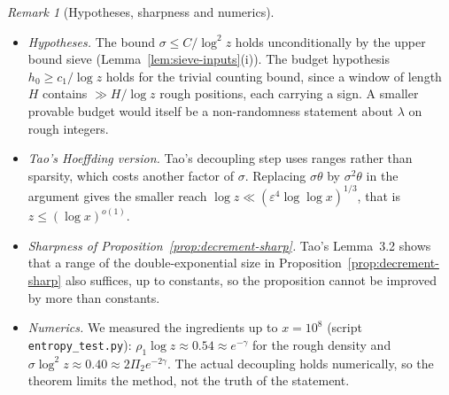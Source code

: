 \documentclass[11pt]{amsart}
\theoremstyle{definition}
\theoremstyle{remark}
\newtheorem{remark}[theorem]{Remark}
\begin{document}
\begin{remark}[Hypotheses, sharpness and numerics]\label{rem:entropy-ceiling}
\leavevmode
\begin{itemize}
\item \emph{Hypotheses.} The bound $\sigma\le C/\log^2z$ holds unconditionally by the upper bound sieve (Lemma~\ref{lem:sieve-inputs}(i)). The budget hypothesis $h_0\ge c_1/\log z$ holds for the trivial counting bound, since a window of length $H$ contains $\gg H/\log z$ rough positions, each carrying a sign. A smaller provable budget would itself be a non-randomness statement about $\lambda$ on rough integers.
\item \emph{Tao's Hoeffding version.} Tao's decoupling step uses ranges rather than sparsity, which costs another factor of $\sigma$. Replacing $\sigma\theta$ by $\sigma^2\theta$ in the argument gives the smaller reach $\log z\ll(\varepsilon^4\log\log x)^{1/3}$, that is $z\le(\log x)^{o(1)}$.
\item \emph{Sharpness of Proposition~\ref{prop:decrement-sharp}.} Tao's Lemma~3.2 shows that a range of the double-exponential size in Proposition~\ref{prop:decrement-sharp} also suffices, up to constants, so the proposition cannot be improved by more than constants.
\item \emph{Numerics.} We measured the ingredients up to $x=10^8$ (script \texttt{entropy\_test.py}): $\rho_1\log z\approx0.54\approx e^{-\gamma}$ for the rough density and $\sigma\log^2z\approx0.40\approx2\Pi_2e^{-2\gamma}$. The actual decoupling holds numerically, so the theorem limits the method, not the truth of the statement.
\end{itemize}
\end{remark}
\end{document}
